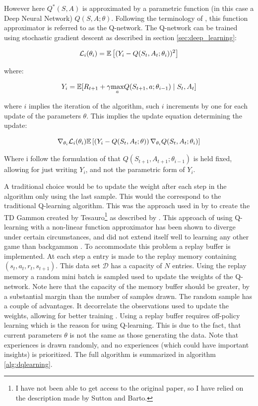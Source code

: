 However here $Q^*(S, A)$ is approximated by a parametric function (in this case a Deep Neural Network) $Q(S, A ; \theta)$. Following the terminology of \textcite{mnih_playing_2013}, this function approximator is referred to as the Q-network. The Q-network can be trained using stochastic gradient descent as described in section \ref{sec:deep_learning}:

\begin{equation}
    \mathcal{L}_i(\theta_i) = \mathbb{E} \left[ (Y_i - Q(S_t, A_t ; \theta_i))^2 \right]
\end{equation}

where:

\begin{equation}
    Y_i = \mathbb{E} [R_{t+1} + \gamma \underset{a}\max Q(S_{t+1}, a; \theta_{i-1}) \mid S_t, A_t ]
\end{equation}

where $i$ implies the iteration of the algorithm, such $i$ increments by one for each update of the parameters $\theta$. This implies the update equation determining the update:

\begin{equation}
    \nabla_{\theta_i} \mathcal{L}_i (\theta_i)  \mathbb{E} \left[ \left( Y_i - Q(S_t, A_t ; \theta) \right) \nabla_{\theta_i} Q(S_t, A_t; \theta_i) \right]
\end{equation}

Where i follow the formulation of \textcite{mnih_playing_2013} that $Q(S_{t+1}, A_{t+1}; \theta_{i-1})$ is held fixed, allowing for just writing $Y_i$, and not the parametric form of $Y_i$.

A traditional choice would be to update the weight after each step in the algorithm only using the last sample. This would the correspond to the traditional Q-learning algorithm. This was the approach used in by to create the TD Gammon created by Tesauro\footnote{I have not been able to get access to the original paper, so I have relied on the description made by Sutton and Barto.} as described by \textcite{sutton_reinforcement_2018}. This approach of using Q-learning with a non-linear function approximator has been shown to diverge under certain circumstances, and did not extend itself well to learning any other game than backgammon \textcite{tsitsiklis_analysis_1997}. To accommodate this problem a replay buffer is implemented. At each step a entry is made to the replay memory containing $(s_t, a_t, r_t, s_{t+1})$. This data set $\mathcal{D}$ has a capacity of $N$ entries. Using the replay memory a random mini batch is sampled used to update the weights of the Q-network. Note here that the capacity of the memory buffer should be greater, by a substantial margin than the number of samples drawn. The random sample has a couple of advantages. It decorrelate the observations used to update the weights, allowing for better training \textcite{mnih_playing_2013}. Using a replay buffer requires off-policy learning which is the reason for using Q-learning. This is due to the fact, that current parameters $\theta$ is not the same as those generating the data. Note that experiences is drawn randomly, and no experiences (which could have important insights) is prioritized. The full algorithm is summarized in algorithm \ref{alg:dqlearning}.

